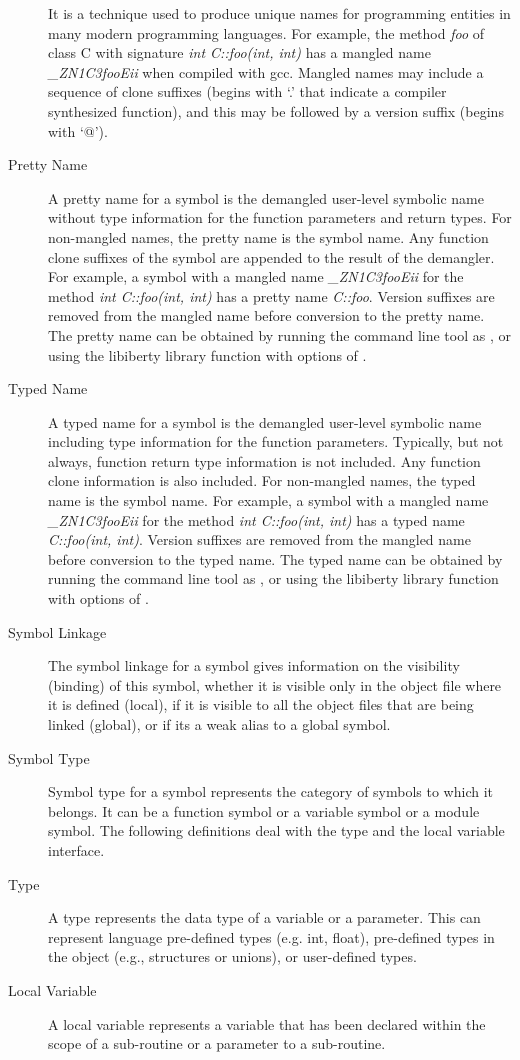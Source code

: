 \begin{description}
It is a technique used to produce unique names for programming entities in many modern programming languages.
For example, the method \emph{foo} of class C with signature \emph{int C::foo(int, int)} has a mangled name \emph{\_ZN1C3fooEii} when compiled with gcc.
Mangled names may include a sequence of clone suffixes (begins with `.' that indicate a compiler synthesized function), and this may be followed by a version suffix (begins with `@').
\item[Pretty Name] A pretty name for a symbol is the demangled user-level symbolic name without type information for the function parameters and return types.
For non-mangled names, the pretty name is the symbol name.
Any function clone suffixes of the symbol are appended to the result of the demangler.
For example, a symbol with a mangled name \emph{\_ZN1C3fooEii} for the method \emph{int C::foo(int, int)} has a pretty name \emph{C::foo}.
Version suffixes are removed from the mangled name before conversion to the pretty name.
The pretty name can be obtained by running the command line tool  as , or using the libiberty library function  with options of .
\item[Typed Name] A typed name for a symbol is the demangled user-level symbolic name including type information for the function parameters.
Typically, but not always, function return type information is not included. Any function clone information is also included.
For non-mangled names, the typed name is the symbol name.
For example, a symbol with a mangled name \emph{\_ZN1C3fooEii} for the method \emph{int C::foo(int, int)} has a typed name \emph{C::foo(int, int)}.
Version suffixes are removed from the mangled name before conversion to the typed name.
The typed name can be obtained by running the command line tool  as , or using the libiberty library function  with options of .
\item[Symbol Linkage] The symbol linkage for a symbol gives information on the visibility (binding) of this symbol, whether it is visible only in the object file where it is defined (local), if it is visible to all the object files that are being linked (global), or if its a weak alias to a global symbol.
\item[Symbol Type] Symbol type for a symbol represents the category of symbols to which it belongs. It can be a function symbol or a variable symbol or a module symbol.
The following definitions deal with the type and the local variable interface.
\item[Type] A type represents the data type of a variable or a parameter. This can represent language pre-defined types (e.g. int, float), pre-defined types in the object (e.g., structures or unions), or user-defined types.
\item[Local Variable] A local variable represents a variable that has been declared within the scope of a sub-routine or a parameter to a sub-routine.
\end{description}

